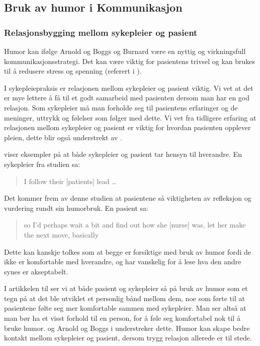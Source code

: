 \subsection{Bruk av humor i Kommunikasjon}

\subsubsection{Relasjonsbygging mellom sykepleier og pasient}
\label{disk.relbygg}

Humor kan ifølge Arnold og Boggs og Burnard være en nyttig og virkningsfull
kommunikasjonsstrategi. Det kan være viktig for pasientens trivsel og kan
brukes til å redusere stress og spenning (referert i ).

I sykepleiepraksis er relasjonen mellom sykepleier og pasient viktig. Vi vet at
det er mye lettere å få til et godt samarbeid med pasienten dersom man har en
god relasjon. Som sykepleier må man forholde seg til pasientens erfaringer og
de meninger, uttrykk og følelser som følger med dette. Vi vet fra tidligere
erfaring at relasjonen mellom sykepleier og pasient er viktig for hvordan
pasienten opplever pleien, dette blir også understrekt av .

 viser eksempler på at både sykepleier og pasient tar hensyn
til hverandre. En sykepleier fra studien sa:
\blockquote[{}]{I follow their [patients] lead
\ldots}. Det kommer frem av denne studien at pasientene så viktigheten av
refleksjon og vurdering rundt sin humorbruk. En pasient sa:
\blockquote[{}]{so I'd perhaps wait a bit and find
out how she [nurse] was, let her make the next move, basically}.

Dette kan kanskje tolkes som at begge er forsiktige med bruk av humor fordi de
ikke er komfortable med hverandre, og har vanskelig for å lese hva den andre
synes er akseptabelt.

I artikkelen til  ser vi at både pasient og sykepleier så på
bruk av humor som et tegn på at det ble utviklet et personlig bånd mellom dem,
noe som førte til at pasientene følte seg mer komfortable sammen med
sykepleier. Man ser altså at man bør ha et visst forhold til en person, for å
føle seg komfortabel nok til å bruke humor.  og Arnold
og Boggs i  understreker dette. Humor kan skape bedre kontakt
mellom sykepleier og pasient, dersom trygg relasjon allerede er til stede.

